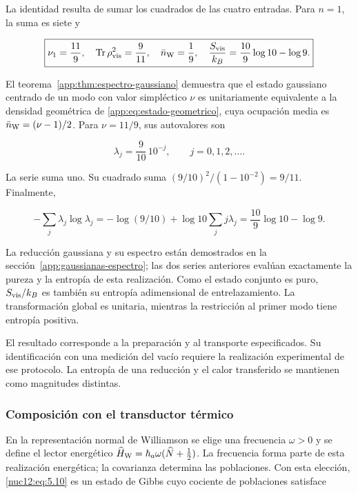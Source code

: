 La identidad resulta de sumar los cuadrados de las cuatro entradas. Para \(n=1\), la suma es siete y



\begin{equation}
\boxed{\nu_1=\frac{11}{9},\quad
\operatorname{Tr}\rho_{\rm vis}^2=\frac9{11},\quad
\bar n_{\rm W}=\frac19,\quad
\frac{S_{\rm vis}}{k_B}=\frac{10}{9}\log10-\log9.}
\label{nuc12:eq:5.9}
\end{equation}



El teorema~\ref{app:thm:espectro-gaussiano} demuestra que el estado gaussiano centrado de un modo con valor simpléctico \(\nu\) es unitariamente equivalente a la densidad geométrica de \eqref{app:eq:estado-geometrico}, cuya ocupación media es \(\bar n_{\rm W}=(\nu-1)/2\). Para \(\nu=11/9\), sus autovalores son



\begin{equation}
\lambda_j=\frac9{10}\,10^{-j},\qquad j=0,1,2,\ldots.
\label{nuc12:eq:5.10}
\end{equation}



La serie suma uno. Su cuadrado suma
\((9/10)^2/(1-10^{-2})=9/11\). Finalmente,


\[
-\sum_j\lambda_j\log\lambda_j
=-\log(9/10)+\log10\sum_jj\lambda_j
=\frac{10}{9}\log10-\log9.
\]



La reducción gaussiana y su espectro están demostrados en la sección~\ref{app:gaussianas-espectro}; las dos series anteriores evalúan exactamente la pureza y la entropía de esta realización. Como el estado conjunto es puro, \(S_{\rm vis}/k_B\) es también su entropía adimensional de entrelazamiento. La transformación global es unitaria, mientras la restricción al primer modo tiene entropía positiva.

El resultado corresponde a la preparación y al transporte especificados. Su identificación con una medición del vacío requiere la realización experimental de ese protocolo. La entropía de una reducción y el calor transferido se mantienen como magnitudes distintas.

\subsubsection{Composición con el transductor térmico}

En la representación normal de Williamson se elige una frecuencia \(\omega>0\) y se define el lector energético
\(\widehat H_{\rm W}=\hbar_a\omega(\widehat N+\tfrac12)\). La frecuencia forma parte de esta realización energética; la covarianza determina las poblaciones. Con esta elección, \eqref{nuc12:eq:5.10} es un estado de Gibbs cuyo cociente de poblaciones satisface



